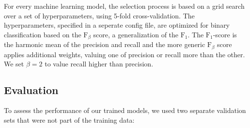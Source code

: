 For every machine learning model, the selection process is based on a grid search over a set of hyperparameters, using 5-fold cross-validation. The hyperparameters, specified in a seperate config file, are optimized for binary classification based on the $\text{F}_{\beta}$ score, a generalization of the $\text{F}_{1}$. The $\text{F}_{1}$-score is the harmonic mean of the precision and recall and the more generic $\text{F}_{\beta}$ score applies additional weights, valuing one of precision or recall more than the other. We set $\beta=2$ to value recall higher than precision. 


\subsection{Evaluation}
To assess the performance of our trained models, we used two separate validation sets that were not part of the training data:

